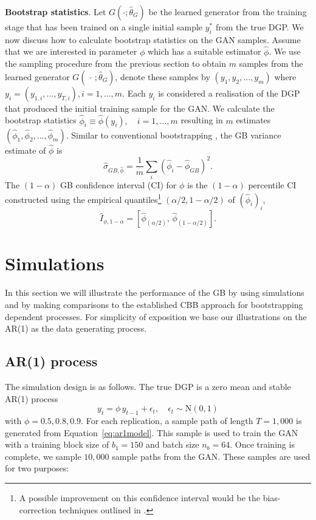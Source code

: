 \documentclass[12pt]{article}
\begin{document}
\textbf{Bootstrap statistics}. Let $G(\cdot; \hat\theta_G)$ be the learned generator from the training stage that has been trained on a single initial sample $y_i^*$ from the true DGP. We now discuss how to calculate bootstrap statistics on the GAN samples. Assume that we are interested in parameter $\phi$ which has a suitable estimator $\hat\phi$. %
We use the sampling procedure from the previous section to obtain $m$ samples from the learned generator $G(\, \cdot \, ; \hat\theta_G)$, denote these samples by $(y_1, y_2, ..., y_m)$ where $y_i = (y_{1,i}, ..., y_{T,i}), i = 1, ..., m$. Each $y_i$ is considered a realisation of the DGP that produced the initial training sample for the GAN. We calculate the bootstrap statistics $\hat\phi_{i} \equiv \hat\phi(y_i), \quad i = 1, ..., m$ resulting in $m$ estimates $(\hat\phi_{1}, \hat\phi_{2}, ..., \hat\phi_{m})$. Similar to conventional bootstrapping \citep{efron1981percentile}, the GB variance estimate of $\hat\phi$ is
\begin{equation}
\hat{\sigma}_{GB,\hat\phi} = \frac{1}{m} \sum_i (\hat\phi_{i} - \hat\phi_{GB})^2.
\end{equation}
The $(1- \alpha)$ GB confidence interval (CI) for $\phi$ is the $(1-\alpha)$ percentile CI \citep{efron1981percentile} constructed using the empirical quantiles\footnote{A possible improvement on this confidence interval would be the bias-correction techniques outlined in \citep{efron1987bca}.} $(\alpha/2, 1 - \alpha/2)$ of $(\hat{\phi}_{i})_i$,
\begin{equation}
\hat{I}_{\phi,1-\alpha} = \left[ \hat{\phi}_{(\alpha/2)}, \, \hat{\phi}_{(1-\alpha/2)} \right].
\end{equation}

\section{Simulations}\label{sec:simulations}
In this section we will illustrate the performance of the GB by using simulations and by making comparisons to the established CBB approach for bootstrapping dependent processes. For simplicity of exposition we base our illustrations on the AR(1) as the data generating process.   
\subsection{AR(1) process}
The simulation design is as follows. The true DGP is a zero mean and stable AR(1) process
\begin{equation}
y_{t} = \phi \, y_{t-1} + \epsilon_t, \quad \epsilon_t \sim \text{N}(0, 1)
\label{eq:ar1model}
\end{equation}
with $\phi = 0.5, 0.8, 0.9$. For each replication, a sample path of length $T = 1,000$ is generated from Equation~\ref{eq:ar1model}. This sample is used to train the GAN with a training block size of $b_1 = 150$ and batch size $n_b = 64$. Once training is complete, we sample $10,000$ sample paths from the GAN. These samples are used for two purposes:
\end{document}
